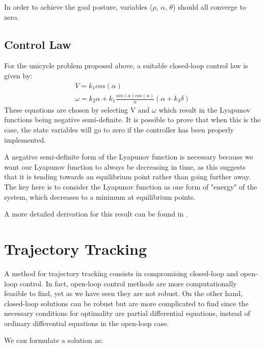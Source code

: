 \documentclass[twoside]{article}
\begin{document}
In order to achieve the goal posture, variables ($\rho$, $\alpha$, $\theta$) should all converge to zero.

\pagebreak
\subsection{Control Law}

For the unicycle problem proposed above, a suitable closed-loop control law is given by:
\begin{equation}
\begin{split}
V=k_1 cos(\alpha) 
\\
\omega=k_2 \alpha + k_1 \frac{sin(\alpha)cos(\alpha)}{\alpha}(\alpha + k_3 \delta)
\end{split}
\end{equation}
These equations are chosen by selecting V and $\omega$ which result in the Lyapunov functions being negative semi-definite. It is possible to prove that when this is the case, the state variables will go to zero if the controller has been properly implemented. 

A negative semi-definite form of the Lyapunov function is necessary because we want our Lyapunov function to always be decreasing in time, as this suggests that it is tending towards an equilibrium point rather than going further away. The key here is to consider the Lyapunov function as one form of "energy" of the system, which decreases to a minimum at equilibrium points. 

A more detailed derivation for this result can be found in \cite{lyupanov}. 


\section{Trajectory Tracking}
A method for trajectory tracking consists in compromising closed-loop and open-loop control. In fact, open-loop control methods are more computationally feasible to find, yet as we have seen they are not robust. On the other hand, closed-loop solutions can be robust but are more complicated to find since the necessary conditions for optimality are partial differential equations, instead of ordinary differential equations in the open-loop case.

We can formulate a solution as:
\end{document}
